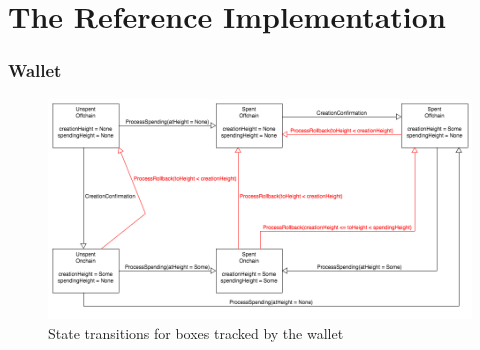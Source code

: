 \documentclass[]{article}   %
\begin{document}
\part{The Reference Implementation}
\label{part-impl}



\section{Wallet}

\begin{figure}[H]
    \centering
    \includegraphics[width=\textwidth]{img/box-transition.png}
    \caption{State transitions for boxes tracked by the wallet
    \label{fig:emission}}
\end{figure}



\end{document}
